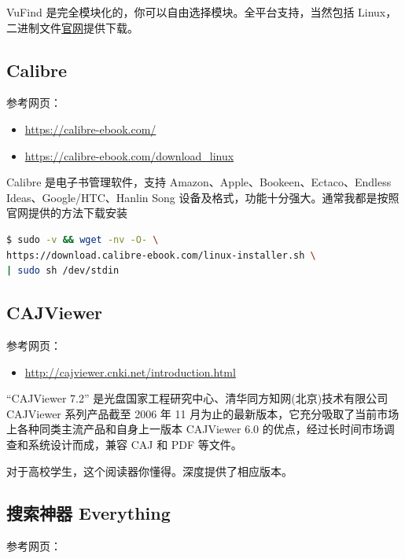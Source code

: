 \documentclass[doctor,openright,twoside]{sjtuthesis}
\providecommand{\tightlist}{%
    \setlength{\itemsep}{0pt}\setlength{\parskip}{0pt}}
\theoremstyle{plain}
\theoremstyle{definition}
\theoremstyle{remark}
\theoremstyle{ocrenumbox}
\theoremstyle{plain}
\begin{document}
VuFind 是完全模块化的，你可以自由选择模块。全平台支持，当然包括
Linux，二进制文件\href{https://vufind.org/vufind/downloads.html}{官网}提供下载。

\hypertarget{calibre}{%
\subsection{Calibre}\label{calibre}}

参考网页：

\begin{itemize}
\tightlist
\item
  \url{https://calibre-ebook.com/}
\item
  \url{https://calibre-ebook.com/download_linux}
\end{itemize}

Calibre 是电子书管理软件，支持 Amazon、Apple、Bookeen、Ectaco、Endless
Ideas、Google/HTC、Hanlin Song
设备及格式，功能十分强大。通常我都是按照官网提供的方法下载安装

\begin{lstlisting}[language=bash, numbers=none]
$ sudo -v && wget -nv -O- \
https://download.calibre-ebook.com/linux-installer.sh \
| sudo sh /dev/stdin
\end{lstlisting}

\hypertarget{cajviewer}{%
\subsection{CAJViewer}\label{cajviewer}}

参考网页：

\begin{itemize}
\tightlist
\item
  \url{http://cajviewer.cnki.net/introduction.html}
\end{itemize}

``CAJViewer 7.2'' 是光盘国家工程研究中心、清华同方知网(北京)技术有限公司
CAJViewer 系列产品截至 2006 年 11
月为止的最新版本，它充分吸取了当前市场上各种同类主流产品和自身上一版本
CAJViewer 6.0 的优点，经过长时间市场调查和系统设计而成，兼容 CAJ 和 PDF
等文件。

对于高校学生，这个阅读器你懂得。深度提供了相应版本。

\hypertarget{-everything}{%
\subsection{搜索神器 Everything}\label{-everything}}

参考网页：
\end{document}
